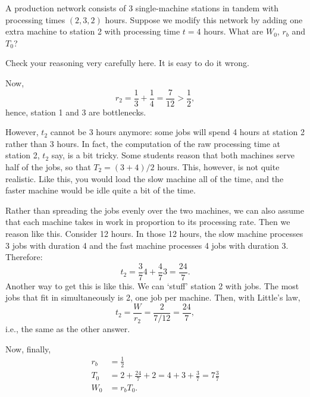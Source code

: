 \begin{exercise}
  A production network consists of 3 single-machine stations in tandem
  with processing times $(2, 3, 2)$ hours.  Suppose we modify this
  network by adding one extra machine to station 2 with
  processing time $t=4$ hours.  What are $W_0$, $r_b$ and $T_0$?
  \begin{hint}
Check your reasoning very carefully here. It is easy to do it wrong.
  \end{hint}
\begin{solution}
Now, 
\begin{equation*}
  r_2 = \frac13 + \frac 14 = \frac 7{12} > \frac12,
\end{equation*}
hence, station 1 and 3 are bottlenecks. 


However, $t_2$ cannot be $3$ hours anymore: some jobs will spend 4
hours at station 2 rather than 3 hours. In fact, the computation of
the raw processing time at station 2, $t_2$ say, is a bit tricky. Some
students reason that both machines serve half of the jobs, so that
$T_2=(3+4)/2$ hours.  This, however, is not quite realistic. Like
this, you would load the slow machine all of the time, and the faster
machine would be idle quite a bit of the time. 


  Rather than spreading the jobs evenly over the two machines, we can
  also assume that each machine takes in work in proportion to its
  processing rate.  Then we reason like this. Consider 12 hours. In
  those 12 hours, the slow machine processes 3 jobs with duration 4
  and the fast machine processes 4 jobs with duration 3. Therefore:
  \begin{equation*}
    t_2 = \frac 3 7 4 + \frac 4 7 3 = \frac{24}7.
  \end{equation*}
  Another way to get this is like this. We can `stuff' station 2 with
  jobs. The most jobs that fit in simultaneously is 2, one job per
  machine. Then, with Little's law,
  \begin{equation*}
   t_2 = \frac{W}{r_2} = \frac{2}{7/12} = \frac{24}7,
  \end{equation*}
i.e., the same as the other answer.

Now, finally, 
    \begin{align*}
      r_b &= \frac12 \\
      T_0 &= 2 + \frac{24}7 + 2 = 4 + 3 + \frac37 = 7 \frac37\\
      W_0 &= r_b T_0.
    \end{align*}


\end{solution}
\end{exercise}
